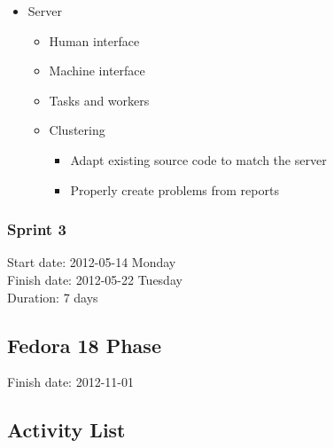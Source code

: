 \documentclass{article}
\begin{document}
\begin{itemize}
\item Server
  \begin{itemize}
  \item Human interface
  \item Machine interface
  \item Tasks and workers
  \item Clustering
    \begin{itemize}
      \item Adapt existing source code to match the server
      \item Properly create problems from reports
    \end{itemize}
  \end{itemize}
\end{itemize}

\subsubsection{Sprint 3}
Start date: 2012-05-14 Monday \\
Finish date: 2012-05-22 Tuesday \\
Duration: 7 days

\subsection{Fedora 18 Phase}
Finish date: 2012-11-01

\subsection{Activity List}
\end{document}
